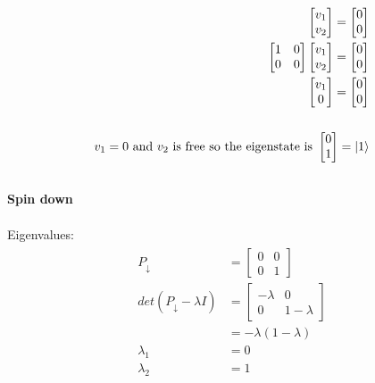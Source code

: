 \documentclass{article}
\begin{document}
\begin{align*}
\begin{split}
\begin{bmatrix}
            v_1 \\
            v_2
        \end{bmatrix} =
        \begin{bmatrix}
            0 \\
            0
        \end{bmatrix} \\
        \begin{bmatrix}
            1 & 0 \\
            0 & 0
        \end{bmatrix} 
        \begin{bmatrix}
            v_1 \\
            v_2
        \end{bmatrix} =
        \begin{bmatrix}
            0 \\
            0
        \end{bmatrix} \\
        \begin{bmatrix}
            v_1 \\
            0
        \end{bmatrix} 
        = \begin{bmatrix} 
            0 \\ 
            0 
        \end{bmatrix} \\\\
        v_1 = 0 \text{ and } v_2 \text{ is free so the eigenstate is } \begin{bmatrix} 0 \\ 1 \end{bmatrix} = \ket{1} \\\\
    \end{split}
\end{align*}
\textbf{Spin down}\\\\
Eigenvalues:
\begin{align*}
    \begin{split}
        P_\downarrow &= \begin{bmatrix} 0 & 0 \\ 0 & 1 \end{bmatrix} \\
        det(P_\downarrow - \lambda I) &= \begin{bmatrix} -\lambda & 0 \\ 0 & 1 - \lambda \end{bmatrix} \\
        &= -\lambda (1 - \lambda) \\
        \lambda_1 &= 0 \\
        \lambda_2 &= 1 \\
    \end{split}
\end{align*}
\end{document}
